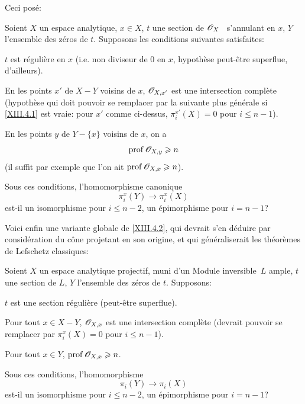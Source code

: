 Ceci pos\'e:

\begin{probleme} \label{XIII.4.2}
Soient $X$ un espace analytique, $x\in X$, $t$ une section de $\mathscr{O}_X$ \ s'annulant en $x$, $Y$ l'ensemble des z\'eros de $t$. Supposons les conditions suivantes satisfaites:
\begin{enumeratea}
\item
$t$ est r\'eguli\`ere en $x$ (i.e. non diviseur de $0$ en $x$, hypoth\`ese peut-\^etre superflue, d'ailleurs).
\item
En les points $x'$ de $X-Y$ voisins de $x$, ${\mathscr O}_{X, x'}$ est une intersection compl\`ete (hypoth\`ese qui doit pouvoir se remplacer par la suivante plus g\'en\'erale si \ref{XIII.4.1} est vraie: pour $x'$ comme ci-dessus, $\pi_i^{x'}(X)=0$ pour $i\le n-1$).
\item
En les points $y$ de $Y-\{ x\}$ voisins de $x$, on a
$$
\operatorname{prof} {\mathscr O}_{X, y}\geqslant n$$
(il suffit par exemple que l'on ait $\operatorname{prof}{\mathscr O}_{X, x}\geqslant n$).
\end{enumeratea}

Sous ces conditions, l'homomorphisme canonique
$$
\pi_i^x(Y)\to \pi_i^x(X)$$
est-il un isomorphisme pour $i\le n-2$, un \'epimorphisme pour $i=n-1$?
\end{probleme}

Voici enfin une variante globale de \ref{XIII.4.2}, qui devrait s'en d\'eduire par consid\'eration du c\^{o}ne projetant en son origine, et qui g\'en\'eraliserait les th\'eor\`emes de Lefschetz classiques:

\begin{probleme} \label{XIII.4.3}
Soient $X$ un espace analytique projectif, muni d'un Module inversible~$L$ ample, $t$ une section de $L$, $Y$ l'ensemble des z\'eros de $t$. Supposons:
\begin{enumeratea}
\item
$t$ est une section r\'eguli\`ere (\ignorespaces peut-\^etre superflue).
\item
Pour tout $x\in X-Y$, ${\mathscr O}_{X, x}$ est une intersection compl\`ete (devrait pouvoir se remplacer par $\pi_i^{x}(X)=0$ pour $i\le n-1$).
\item
Pour tout $x\in Y$, $\operatorname{prof} {\mathscr O}_{X, x}\geqslant n$.
\end{enumeratea}

Sous ces conditions, l'homomorphisme
$$
\pi_i(Y)\to \pi_i(X)$$
est-il un isomorphisme pour $i\le n-2$, un \'epimorphisme pour $i=n-1$?
\end{probleme}

